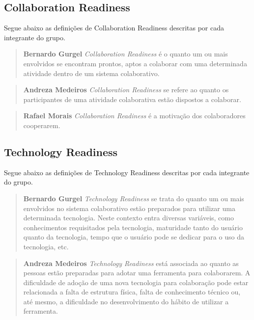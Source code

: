 \documentclass{acm_proc_article-sp}
\begin{document}
\subsection{Collaboration Readiness}
Segue abaixo as definições de Collaboration Readiness descritas por cada integrante do grupo.

\begin{quote}\textbf{Bernardo Gurgel}
\textsl{Collaboration Readiness} é o quanto um ou mais envolvidos se encontram prontos, aptos a colaborar com uma determinada atividade dentro de um sistema colaborativo.
\end{quote}

\begin{quote}\textbf{Andreza Medeiros}
  \textsl{Collaboration Readiness} se refere ao quanto os participantes de uma atividade colaborativa estão dispostos a colaborar.
\end{quote}

\begin{quote}\textbf{Rafael Morais}
  \textsl{Collaboration Readiness} é a motivação dos colaboradores cooperarem.
\end{quote}

\subsection{Technology Readiness}
Segue abaixo as definições de Technology Readiness descritas por cada integrante do grupo.

\begin{quote}\textbf{Bernardo Gurgel}
\textsl{Technology Readiness} se trata do quanto um ou mais envolvidos no sistema colaborativo estão preparados para utilizar uma determinada tecnologia. Neste contexto entra diversas variáveis, como conhecimentos requisitados pela tecnologia, maturidade tanto do usuário quanto da tecnologia, tempo que o usuário pode se dedicar para o uso da tecnologia, etc.
\end{quote}

\begin{quote}\textbf{Andreza Medeiros}
\textsl{Technology Readiness} está associada ao quanto as pessoas estão preparadas para adotar uma ferramenta para colaborarem. A dificuldade de adoção de uma nova tecnologia para colaboração pode estar relacionada a falta de estrutura física, falta de conhecimento técnico ou, até mesmo, a dificuldade no desenvolvimento do hábito de utilizar a ferramenta.
\end{quote}
\end{document}
